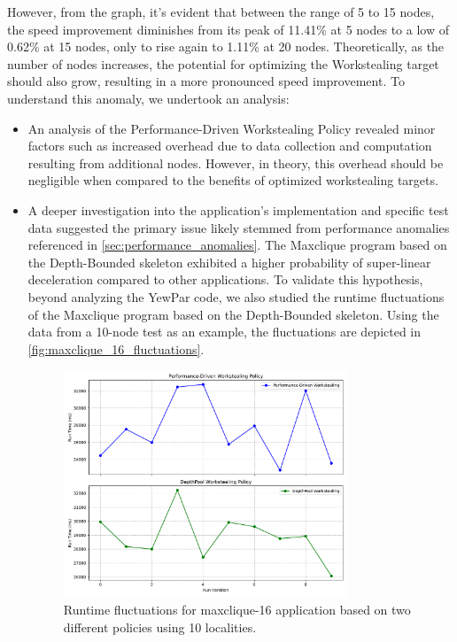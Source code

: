 \documentclass{mproj}
\begin{document}
However, from the graph, it's evident that between the range of 5 to 15 nodes,
the speed improvement diminishes from its peak of 11.41\% at 5 nodes to a low of 0.62\% at 15 nodes,
only to rise again to 1.11\% at 20 nodes.
Theoretically, as the number of nodes increases,
the potential for optimizing the Workstealing target should also grow,
resulting in a more pronounced speed improvement.
To understand this anomaly, we undertook an analysis:
\begin{itemize}
    \item An analysis of the Performance-Driven Workstealing Policy revealed minor factors such as increased overhead due to data collection and computation resulting from additional nodes.
          However, in theory, this overhead should be negligible when compared to the benefits of optimized workstealing targets.
    \item A deeper investigation into the application's implementation and specific test data suggested the primary issue likely stemmed from performance anomalies referenced in \ref{sec:performance_anomalies}.
          The Maxclique program based on the Depth-Bounded skeleton exhibited a higher probability of super-linear deceleration compared to other applications.
          To validate this hypothesis, beyond analyzing the YewPar code,
          we also studied the runtime fluctuations of the Maxclique program based on the Depth-Bounded skeleton.
          Using the data from a 10-node test as an example, the fluctuations are depicted in \ref{fig:maxclique_16_fluctuations}.
          \begin{figure}[h]
              \centering
              \includegraphics[width=0.8\textwidth]{images/maxclique_16_fluctuations.pdf}
              \caption{Runtime fluctuations for maxclique-16 application based on two different policies using 10 localities.}

\end{figure}
\end{itemize}
\end{document}
